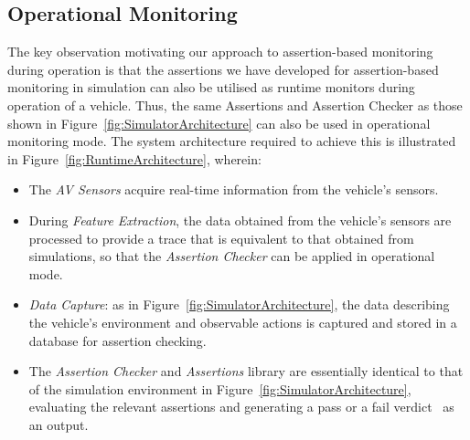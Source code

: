 \subsection{Operational Monitoring}
The key observation motivating our approach to assertion-based monitoring during operation is that the assertions we have developed for assertion-based monitoring in simulation can also be utilised as runtime monitors during operation of a vehicle.
%
Thus, the same Assertions and Assertion Checker as those shown in Figure~\ref{fig:SimulatorArchitecture} can also be used in operational monitoring mode. The system architecture required to achieve this is illustrated in Figure~\ref{fig:RuntimeArchitecture}, wherein:
\begin{itemize}
    \item The \emph{AV Sensors} acquire real-time information from the vehicle's sensors.
    \item During \emph{Feature Extraction}, the data obtained from the vehicle's sensors are processed to provide a trace that is equivalent to that obtained from simulations, so that the \emph{Assertion Checker} can be applied in operational mode.
    \item \emph{Data Capture}: as in %
 Figure~\ref{fig:SimulatorArchitecture}, the data describing the vehicle's environment and observable actions is captured and stored in a database for  assertion checking.
    \item The \emph{Assertion Checker} and \emph{Assertions} library are essentially identical to that of the simulation environment in Figure~\ref{fig:SimulatorArchitecture}, evaluating the relevant assertions and generating a pass or a fail verdict~\cite{RuntimeReview} as an output. 
 
\end{itemize}

  
